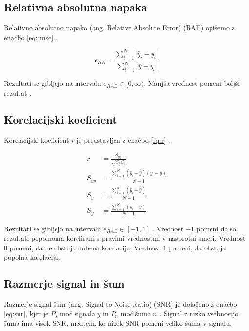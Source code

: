 \subsection{Relativna absolutna napaka}
Relativno absolutno napako (ang. Relative Absolute Error) (RAE) opišemo z enačbo \eqref{eq:rmse} \cite{trucco1998introductory}.

\begin{equation}
e_{RA} = \frac{\sum_{i=1}^{N} \left | \hat{y}_i - y_i \right |}{\sum_{i=1}^{N} \left| \overline{y} - y_i \right|}
\label{eq:rae}
\end{equation}

Rezultati se gibljejo na intervalu $e_{RAE} \in [0, \infty)$. Manjša vrednost pomeni boljši rezultat \cite{witten2005data}.

\subsection{Korelacijski koeficient}
Korelacijski koeficient $r$ je predstavljen z enačbo \eqref{eq:r} \cite{witten2005data}.

\begin{subequations}
\begin{align}
r &= \frac{S_{\hat{y}y}}{\sqrt{S_{\hat{y}} S_y}} \\
S_{\hat{y}y} &= \frac{\sum_{i=1}^N \left(\hat{y}_i - \overline{\hat{y}}\right)\left(y_i - \overline{y}\right) }{N-1} \\
S_{\hat{y}} &= \frac{\sum_{i=1}^N \left(\hat{y}_i - \overline{\hat{y}}\right)}{N-1} \\
S_y &= \frac{\sum_{i=1}^N \left(y_i - \overline{y}\right) }{N-1}
\end{align}
\label{eq:r}
\end{subequations}

Rezultati se gibljejo na intervalu $e_{RAE} \in [-1, 1]$ \cite{witten2005data}. Vrednost $-1$ pomeni da so rezultati popolnoma korelirani s pravimi vrednostmi v nasprotni smeri. Vrednost $0$ pomeni, da ne obstaja nobena korelacija. Vrednost $1$ pomeni, da obstaja popolna korelacija.  


\subsection{Razmerje signal in šum}
Razmerje signal šum (ang. Signal to Noise Ratio) (SNR) je določeno z enačbo \eqref{eq:snr}, kjer je $P_s$ moč signala $y$ in $P_n$ moč šuma $n$ \cite{gonzalez2006digital}. Signal z nizko vsebnostjo šuma ima visok SNR, medtem, ko nizek SNR pomeni veliko šuma v signalu.

